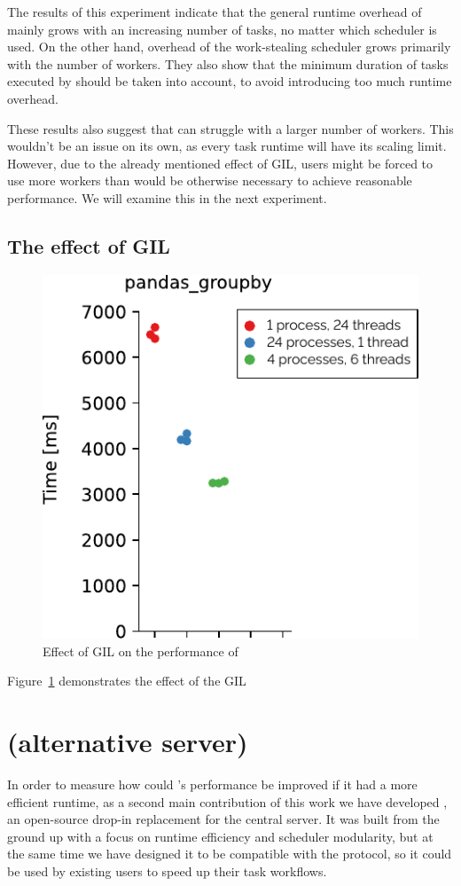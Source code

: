 The results of this experiment indicate that the general runtime overhead of \dask{} mainly
grows with an increasing number of tasks, no matter which scheduler is used. On the other hand, overhead
of the work-stealing scheduler grows primarily with the number of workers. They also show that
the minimum duration of tasks executed by \dask{} should be taken into account, to avoid
introducing too much runtime overhead.

These results also suggest that \dask{} can struggle with a larger number of workers. This
wouldn't be an issue on its own, as every task runtime will have its scaling limit. However, due
to the already mentioned effect of GIL, \dask{} users might be forced to use more workers than
would be otherwise necessary to achieve reasonable performance. We will examine this in the next
experiment.

\subsection*{The effect of GIL}

\begin{figure}
	\centering
	\includegraphics[width=0.3\linewidth]{./imgs/rsds/charts/dask-gil-scaling}
	\caption{Effect of GIL on the performance of \dask{}}
	\label{fig:dask-gil-scaling}
\end{figure}

Figure~\ref{fig:dask-gil-scaling} demonstrates the effect of the GIL



\section{\rsds{} (alternative \dask{} server)}
\label{sec:rsds-description}

In order to measure how could \dask{}'s performance be improved if it had a more
efficient runtime, as a second main contribution of this work we have developed
\rsds{}, an open-source drop-in replacement for the \dask{} central
server. It was built from the ground up with a focus on runtime efficiency
and scheduler modularity, but at the same time we have designed it to be compatible with the
\dask{} protocol, so it could be used by existing \dask{} users to
speed up their task workflows.


